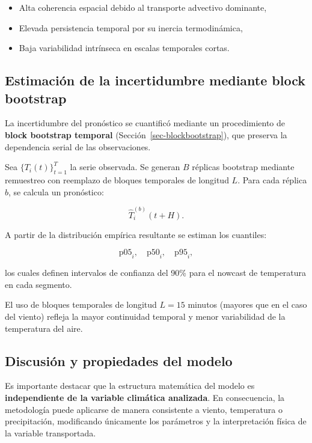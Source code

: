 \documentclass[
  spanish,
  us-letterpaper,
]{scrreprt}
\providecommand{\tightlist}{%
  \setlength{\itemsep}{0pt}\setlength{\parskip}{0pt}}
\numberwithin{equation}{section}
\begin{document}
\begin{itemize}
\tightlist
\item
  Alta coherencia espacial debido al transporte advectivo dominante,
\item
  Elevada persistencia temporal por su inercia termodinámica,
\item
  Baja variabilidad intrínseca en escalas temporales cortas.
\end{itemize}

\subsection{Estimación de la incertidumbre mediante block
bootstrap}\label{estimaciuxf3n-de-la-incertidumbre-mediante-block-bootstrap}

La incertidumbre del pronóstico se cuantificó mediante un procedimiento
de \textbf{block bootstrap temporal} (Sección~\ref{sec-blockbootstrap}),
que preserva la dependencia serial de las observaciones.

Sea \(\{T_i(t)\}_{t=1}^T\) la serie observada. Se generan \(B\) réplicas
bootstrap mediante remuestreo con reemplazo de bloques temporales de
longitud \(L\). Para cada réplica \(b\), se calcula un pronóstico:

\[
\hat{T}_i^{(b)}(t+H).
\]

A partir de la distribución empírica resultante se estiman los
cuantiles:

\[
\text{p05}_i, \quad \text{p50}_i, \quad \text{p95}_i,
\]

los cuales definen intervalos de confianza del 90\% para el nowcast de
temperatura en cada segmento.

El uso de bloques temporales de longitud \(L = 15\) minutos (mayores que
en el caso del viento) refleja la mayor continuidad temporal y menor
variabilidad de la temperatura del aire.

\subsection{Discusión y propiedades del
modelo}\label{discusiuxf3n-y-propiedades-del-modelo}

Es importante destacar que la estructura matemática del modelo es
\textbf{independiente de la variable climática analizada}. En
consecuencia, la metodología puede aplicarse de manera consistente a
viento, temperatura o precipitación, modificando únicamente los
parámetros y la interpretación física de la variable transportada.
\end{document}
